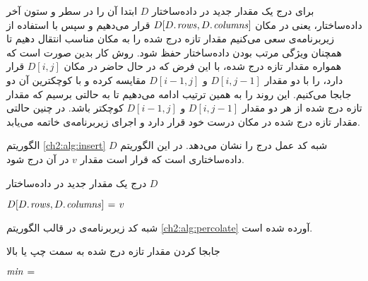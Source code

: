 
برای درج یک مقدار جدید در داده‌ساختار {$D$} ابتدا آن را در سطر و ستون آخر داده‌ساختار، یعنی در مکان {$D[D.\hspace*{1pt}\mathit{rows},D.\hspace*{1pt}\mathit{columns}]$} قرار می‌دهیم و سپس با استفاده از زیربرنامه‌ی
{} سعی می‌کنیم مقدار تازه درج شده را به مکان مناسب انتقال دهیم تا همچنان ویژگی مرتب بودن داده‌ساختار حفظ شود. روش کار بدین صورت است که همواره مقدار تازه درج شده، با این فرض که در حال حاضر در مکان {$D[i,j]$} قرار دارد، را با دو مقدار {$D[i,j-1]$} و {$D[i-1,j]$} مقایسه کرده و با کوچکترین آن دو جابجا می‌کنیم. این روند را به همین ترتیب ادامه می‌دهیم تا به حالتی برسیم که مقدار تازه درج شده از هر دو مقدار {$D[i,j-1]$} و {$D[i-1,j]$} کوچکتر باشد. در چنین حالتی  مقدار تازه درج شده در مکان درست خود قرار دارد و اجرای زیربرنامه‌ی {} خاتمه می‌یابد.

الگوریتم {\eqref{ch2:alg:insert}} شبه کد عمل درج را نشان می‌دهد. در این الگوریتم {$D$} داده‌ساختاری است که قرار است مقدار {$v$} در آن درج شود.
\begin{algorithm}
\caption{درج یک مقدار جدید در داده‌ساختار {$D$}}\label{ch2:alg:insert}
\begin{latin}
\begin{algorithmic}[1]
		\State	$D[D.\hspace*{1pt}\mathit{rows},D.\hspace*{1pt}\mathit{columns}] \mathrel{\hspace{1pt}=\hspace{1pt}} v$
		\State	{}
\EndProcedure
\end{algorithmic}
\end{latin}
\end{algorithm}

شبه کد زیربرنامه‌ی {} در قالب الگوریتم {\eqref{ch2:alg:percolate}} آورده شده است.
\begin{algorithm}
\caption{جابجا کردن مقدار تازه درج شده به سمت چپ یا بالا}\label{ch2:alg:percolate}
\begin{latin}
\begin{algorithmic}[1]
		\State	$\mathit{min} \mathrel{\hspace{1pt}=\hspace{1pt}}$ 
				\State	\Return
				\State	{}
				\State	{}
		\Else
				\State	{}
				\State	{}
		\EndIf		
\EndProcedure
\end{algorithmic}
\end{latin}
\end{algorithm}

